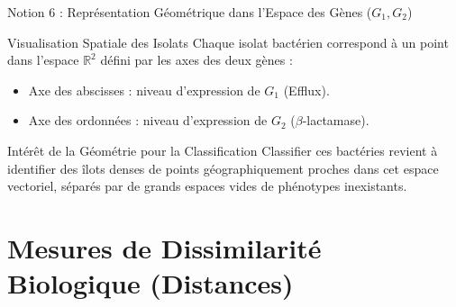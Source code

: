 \documentclass[aspectratio=169,10pt]{beamer}
\begin{document}
\begin{frame}{Notion 6 : Représentation Géométrique dans l'Espace des Gènes ($G_1, G_2$)}
  \begin{conceptbox}{Visualisation Spatiale des Isolats}
    \footnotesize
    Chaque isolat bactérien correspond à un point dans l'espace $\mathbb{R}^2$ défini par les axes des deux gènes :
    \begin{itemize}
      \item Axe des abscisses : niveau d'expression de $G_1$ (Efflux).
      \item Axe des ordonnées : niveau d'expression de $G_2$ ($\beta$-lactamase).
    \end{itemize}
  \end{conceptbox}
  \vspace{1mm}
  \begin{takeawaybox}{Intérêt de la Géométrie pour la Classification}
    \footnotesize
    Classifier ces bactéries revient à identifier des îlots denses de points géographiquement proches dans cet espace vectoriel, séparés par de grands espaces vides de phénotypes inexistants.
  \end{takeawaybox}
\end{frame}

\section{Mesures de Dissimilarité Biologique (Distances)}
\end{document}
